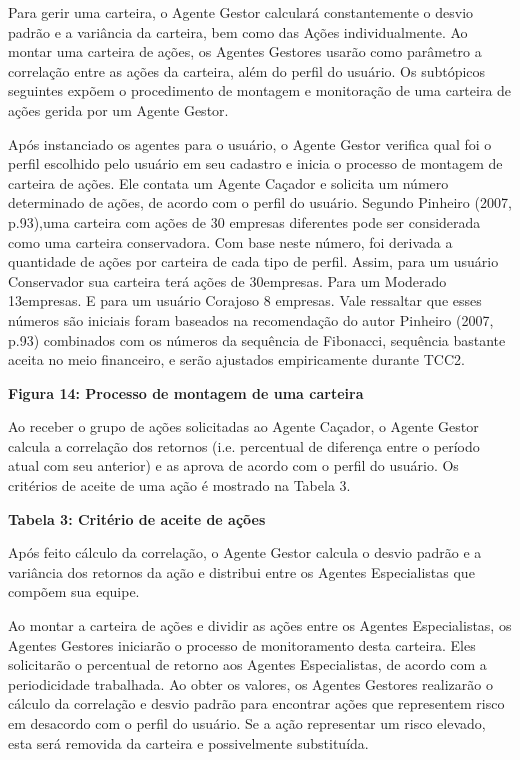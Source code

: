 Para gerir uma carteira, o Agente Gestor calculará constantemente o desvio padrão e a variância da carteira, bem como das Ações individualmente. Ao montar uma carteira de ações, os Agentes Gestores usarão como parâmetro a correlação entre as ações da carteira, além do perfil do usuário. Os subtópicos seguintes expõem o procedimento de montagem e monitoração de uma carteira de ações gerida por um Agente Gestor.


Após instanciado os agentes para o usuário, o Agente Gestor verifica qual foi o perfil escolhido pelo usuário em seu cadastro e inicia o processo de montagem de carteira de ações. Ele contata um Agente Caçador e solicita um número determinado de ações, de acordo com o perfil do usuário. Segundo Pinheiro (2007, p.93),uma carteira com ações de 30 empresas diferentes pode ser considerada como uma carteira conservadora. Com base neste número, foi derivada a quantidade de ações por carteira de cada tipo de perfil. Assim, para um usuário Conservador sua carteira terá ações de 30empresas. Para um Moderado 13empresas. E para um usuário Corajoso 8 empresas. Vale ressaltar que esses números são iniciais foram baseados na recomendação do autor Pinheiro (2007, p.93) combinados com os números da sequência de Fibonacci, sequência bastante aceita no meio financeiro, e serão ajustados empiricamente durante TCC2.

\textbf{Figura 14: Processo de montagem de uma carteira}

Ao receber o grupo de ações solicitadas ao Agente Caçador, o Agente Gestor calcula a correlação dos retornos (i.e. percentual de diferença entre o período atual com seu anterior) e as aprova de acordo com o perfil do usuário. Os critérios de aceite de uma ação é mostrado na Tabela 3.

\textbf{Tabela 3: Critério de aceite de ações}

Após feito cálculo da correlação, o Agente Gestor calcula o desvio padrão e a variância dos retornos da ação e distribui entre os Agentes Especialistas que compõem sua equipe.


Ao montar a carteira de ações e dividir as ações entre os Agentes Especialistas, os Agentes Gestores iniciarão o processo de monitoramento desta carteira. Eles solicitarão o percentual de retorno aos Agentes Especialistas, de acordo com a periodicidade trabalhada. Ao obter os valores, os Agentes Gestores realizarão o cálculo da correlação e desvio padrão para encontrar ações que representem risco em desacordo com o perfil do usuário. Se a ação representar um risco elevado, esta será removida da carteira e possivelmente substituída.


